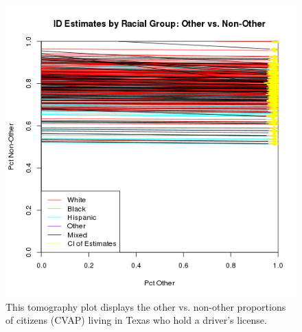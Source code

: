 \documentclass[12pt]{article}
\begin{document}
\begin{figure}[htb]
\begin{centering}
\includegraphics[scale=.75]{figs/CVAP_f3_dl_other.png}
\caption{\label{tomog_other}This tomography plot displays the other vs. non-other proportions of citizens (CVAP)
living in Texas who hold a driver's license.}
\end{centering}
\end{figure}

\clearpage
\singlespace
 
\bibsep=0in 
{}

\end{document}
